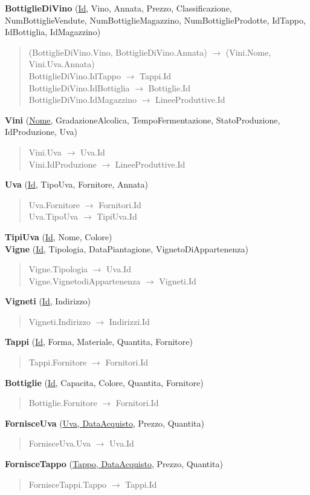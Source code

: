 \textbf{BottiglieDiVino} (\underline{Id}, Vino, Annata, Prezzo, Classificazione, NumBottiglieVendute, NumBottiglieMagazzino, NumBottiglieProdotte, IdTappo, IdBottiglia, IdMagazzino)
\begin{verse}
	(BottiglieDiVino.Vino, BottiglieDiVino.Annata) $\to$ (Vini.Nome, Vini.Uva.Annata)\\
	BottiglieDiVino.IdTappo $\to$ Tappi.Id\\
	BottiglieDiVino.IdBottiglia $\to$ Bottiglie.Id\\
	BottiglieDiVino.IdMagazzino $\to$ LineeProduttive.Id
\end{verse} 
\textbf{Vini} (\underline{Nome}, GradazioneAlcolica, TempoFermentazione, StatoProduzione, IdProduzione, Uva)
\begin{verse}
	Vini.Uva $\to$ Uva.Id\\
	Vini.IdProduzione $\to$ LineeProduttive.Id
\end{verse} 
\textbf{Uva} (\underline{Id}, TipoUva, Fornitore, Annata)
\begin{verse}
	Uva.Fornitore $\to$ Fornitori.Id\\
	Uva.TipoUva $\to$ TipiUva.Id
\end{verse}
\textbf{TipiUva} (\underline{Id}, Nome, Colore)\\
\textbf{Vigne} (\underline{Id}, Tipologia, DataPiantagione, VignetoDiAppartenenza)
\begin{verse}
	Vigne.Tipologia $\to$ Uva.Id\\
	Vigne.VignetodiAppartenenza $\to$ Vigneti.Id
\end{verse} 
\textbf{Vigneti} (\underline{Id}, Indirizzo)
\begin{verse}
	Vigneti.Indirizzo $\to$ Indirizzi.Id
\end{verse} 
\textbf{Tappi} (\underline{Id}, Forma, Materiale, Quantita, Fornitore)
\begin{verse}
	Tappi.Fornitore $\to$ Fornitori.Id
\end{verse}
\textbf{Bottiglie} (\underline{Id}, Capacita, Colore, Quantita, Fornitore)
\begin{verse}
	Bottiglie.Fornitore $\to$ Fornitori.Id
\end{verse}
\textbf{FornisceUva} (\underline{Uva, DataAcquisto}, Prezzo, Quantita)
\begin{verse}
	FornisceUva.Uva $\to$ Uva.Id
\end{verse}
\textbf{FornisceTappo} (\underline{Tappo, DataAcquisto}, Prezzo, Quantita)
\begin{verse}
	FornisceTappi.Tappo $\to$ Tappi.Id
\end{verse} 
